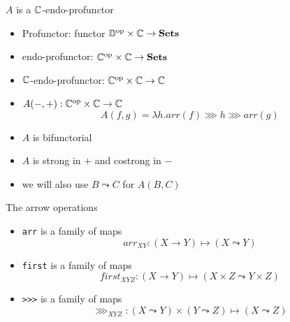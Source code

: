\begin{frame}[fragile]
\begin{center}\Large $A$ is a $\mathbb{C}$-endo-profunctor\end{center}
    \begin{itemize}
        \item Profunctor: functor ${\mathbb{D}}^{\text{op}} \times \mathbb{C} \to \mathbf{Sets}$
        \item endo-profunctor: ${\mathbb{C}}^{\text{op}} \times \mathbb{C} \to \mathbf{Sets}$
        \item $\mathbb{C}$-endo-profunctor: ${\mathbb{C}}^{\text{op}} \times \mathbb{C} \to \mathbb{C}$
        \item $A(-, +): {\mathbb{C}}^{\text{op}} \times \mathbb{C} \to \mathbb{C}$
            \[
                    A(f, g) = \lambda h. arr(f) \ggg h \ggg arr(g)
            \]
        \item $A$ is bifunctorial
        \item $A$ is strong in $+$ and costrong in $-$
        \item we will also use $B \leadsto C$ for $A(B, C)$
    \end{itemize}
\end{frame}

\begin{frame}[fragile]
    \begin{center}\Large The arrow operations\end{center}
    \begin{itemize}
        \item \verb|arr| is a family of maps
            \[ arr_{XY}: (X \to Y) \mapsto (X \leadsto Y) \]
        \item \verb|first| is a family of maps
            \[ first_{XYZ}: (X \to Y) \mapsto (X \times Z \leadsto Y \times Z) \]
        \item \verb|>>>| is a family of maps
            \[ \ggg_{XYZ}: (X \leadsto Y) \times (Y \leadsto Z) \mapsto (X \leadsto Z) \]
    \end{itemize}
\end{frame}

